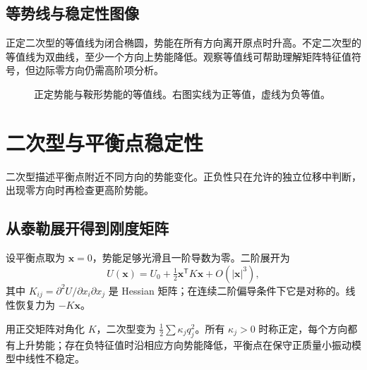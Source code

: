 \documentclass[11pt,openany,fontset=fandol]{ctexbook}
\theoremstyle{plain}\newtheorem{theorem}{定理}[chapter]\newtheorem{proposition}[theorem]{命题}
\theoremstyle{definition}\newtheorem{definition}{定义}[chapter]\newtheorem{example}{例}[chapter]
\theoremstyle{remark}\newtheorem*{remark}{说明}
\newcommand{\vct}[1]{\bm{#1}}\newcommand{\Rea}{\operatorname{Re}}\newcommand{\Ima}{\operatorname{Im}}
\begin{document}
\subsection{等势线与稳定性图像}
正定二次型的等值线为闭合椭圆，势能在所有方向离开原点时升高。不定二次型的等值线为双曲线，至少一个方向上势能降低。观察等值线可帮助理解矩阵特征值符号，但边际零方向仍需高阶项分析。
\begin{figure}[htbp]\centering
{}
\caption{正定势能与鞍形势能的等值线。右图实线为正等值，虚线为负等值。}
\label{fig:orig-063}
\end{figure}

\section{二次型与平衡点稳定性}
二次型描述平衡点附近不同方向的势能变化。正负性只在允许的独立位移中判断，出现零方向时再检查更高阶势能。

\subsection{从泰勒展开得到刚度矩阵}
设平衡点取为 $\vct x=0$，势能足够光滑且一阶导数为零。二阶展开为
\begin{equation}
U(\vct x)=U_0+\tfrac12\vct x^{\mathsf T}K\vct x+O(|\vct x|^3),
\end{equation}
其中 $K_{ij}=\partial^2U/\partial x_i\partial x_j$ 是 Hessian 矩阵；在连续二阶偏导条件下它是对称的。线性恢复力为 $-K\vct x$。

用正交矩阵对角化 $K$，二次型变为 $\tfrac12\sum\kappa_jq_j^2$。所有 $\kappa_j>0$ 时称正定，每个方向都有上升势能；存在负特征值时沿相应方向势能降低，平衡点在保守正质量小振动模型中线性不稳定。
\end{document}
